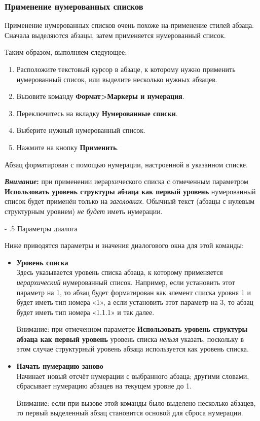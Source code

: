 \documentclass[a4paper,10pt]{article}
\makeatletter
\renewcommand\paragraph{%
   \@startsection{paragraph}{4}{0mm}%
      {-\baselineskip}%
      {.5\baselineskip}%
      {\normalfont\normalsize\bfseries}}
\makeatother
\begin{document}
\subsubsection{Применение нумерованных списков}
Применение нумерованных списков очень похоже на применение стилей абзаца. Сначала выделяются абзацы, затем применяется нумерованный список.

Таким образом, выполняем следующее:
\begin{enumerate}
 \item Расположите текстовый курсор в абзаце, к которому нужно применить нумерованный список, или выделите несколько нужных абзацев.
 \item Вызовите команду \textbf{Формат>Маркеры и нумерация}.
 \item Переключитесь на вкладку \textbf{Нумерованные списки}.
 \item Выберите нужный нумерованный список.
 \item Нажмите на кнопку \textbf{Применить}.
\end{enumerate}

Абзац форматирован с помощью нумерации, настроенной в указанном списке.

\begin{mdframed}[backgroundcolor=blue!10]
\textbf{\textit{Внимание}:} при применении иерархического списка с отмеченным параметром \textbf{Использовать уровень структуры абзаца как первый уровень} нумерованный список будет применён только на \textit{заголовках}. Обычный текст (абзацы с нулевым структурным уровнем) \textit{не будет} иметь нумерации.
\end{mdframed}

\paragraph{Параметры диалога}

Ниже приводятся параметры и значения диалогового окна для этой команды:
\begin{itemize}
 \item \textbf{Уровень списка}\\
 Здесь указывается уровень списка абзаца, к которому применяется \textit{иерархический} нумерованный список. Например, если установить этот параметр на 1, то абзац будет форматирован как элемент списка уровня 1 и будет иметь тип номера «1», а если установить этот параметр на 3, то абзац будет иметь тип номера «1.1.1» и так далее.
 
 Внимание: при отмеченном параметре \textbf{Использовать уровень структуры абзаца как первый уровень} уровень списка \textit{нельзя} указать, поскольку в этом случае структурный уровень абзаца используется как уровень списка.
 \item \textbf{Начать нумерацию заново}\\
 Начинает новый отсчёт нумерации с выбранного абзаца; другими словами, сбрасывает нумерацию абзацев на текущем уровне до 1.
 
 Внимание: если при вызове этой команды было выделено несколько абзацев, то первый выделенный абзац становится основой для сброса нумерации.
\end{itemize}
\end{document}
